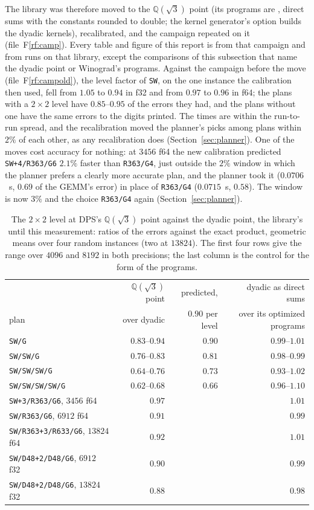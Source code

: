 \documentclass[11pt]{article}
\newcommand{\rf}[1]{F\ref{rf:#1}}
\newcommand{\lv}[1]{\texttt{#1}}
\begin{document}
The library was therefore moved to the $\mathbb{Q}(\sqrt3)$ point
(its programs are , direct sums with the
constants rounded to double; the kernel generator's
option  builds the dyadic kernels), recalibrated,
and the campaign repeated on it (file~\rf{camp}).  Every table and figure of
this report is from that campaign and from runs on that library, except the
comparisons of this subsection that name the dyadic point or Winograd's
programs.  Against the campaign before the move (file~\rf{campold}), the
level factor of \lv{SW}, on the one instance the calibration then used, fell from $1.05$ to $0.94$ in f32 and from
$0.97$ to $0.96$ in f64; the plans with a $2\times2$ level have $0.85$--$0.95$
of the errors they had, and the plans
without one have the same errors to the digits printed.  The times are within the
run-to-run spread, and the recalibration moved the planner's picks among
plans within $2\%$ of each other, as any recalibration does
(Section~\ref{sec:planner}).  One of the moves cost accuracy for nothing: at $3456$ f64 the
new calibration predicted \lv{SW+4/R363/G6} $2.1\%$ faster than
\lv{R363/G4}, just outside the $2\%$ window in which the planner prefers a
clearly more accurate plan, and the planner took it ($0.0706$~s, $0.69$ of the
GEMM's error) in place of \lv{R363/G4} ($0.0715$~s, $0.58$).  The window is
now $3\%$ and the choice \lv{R363/G4} again (Section~\ref{sec:planner}).

\begin{table}[!tbp]
\centering\footnotesize
\begin{tabular}{lrrr}
\toprule
 & $\mathbb{Q}(\sqrt3)$ point & predicted, & dyadic as direct sums\\
plan & over dyadic & $0.90$ per level & over its optimized programs\\
\midrule
\lv{SW/G} & $0.83$--$0.94$ & $0.90$ & $0.99$--$1.01$\\
\lv{SW/SW/G} & $0.76$--$0.83$ & $0.81$ & $0.98$--$0.99$\\
\lv{SW/SW/SW/G} & $0.64$--$0.76$ & $0.73$ & $0.93$--$1.02$\\
\lv{SW/SW/SW/SW/G} & $0.62$--$0.68$ & $0.66$ & $0.96$--$1.10$\\
\midrule
\lv{SW+3/R363/G6}, $3456$ f64 & $0.97$ & & $1.01$\\
\lv{SW/R363/G6}, $6912$ f64 & $0.91$ & & $0.99$\\
\lv{SW/R363+3/R633/G6}, $13824$ f64 & $0.92$ & & $1.01$\\
\lv{SW/D48+2/D48/G6}, $6912$ f32 & $0.90$ & & $0.99$\\
\lv{SW/D48+2/D48/G6}, $13824$ f32 & $0.88$ & & $0.98$\\
\bottomrule
\end{tabular}
\caption{The $2\times2$ level at DPS's $\mathbb{Q}(\sqrt3)$ point against
the dyadic point, the library's until this measurement: ratios of the errors against the exact
product, geometric means over four random instances (two at $13824$).  The
first four rows give the range over $4096$ and $8192$ in both precisions; the
last column is the control for the form of the programs.}
\label{tab:q3}
\end{table}
\end{document}
